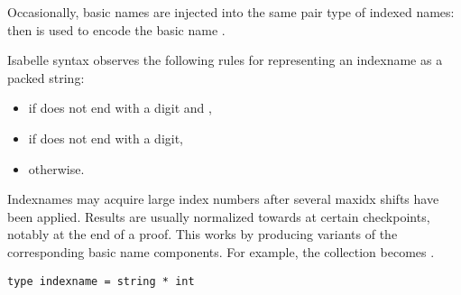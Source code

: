 \begin{isabellebody}
\begin{isamarkuptext}
  Occasionally, basic names are injected into the same pair type of
  indexed names: then  is used to encode the basic
  name .

  \medskip Isabelle syntax observes the following rules for
  representing an indexname  as a packed string:

  \begin{itemize}

  \item {} if  does not end with a digit and ,

  \item {} if  does not end with a digit,

  \item {} otherwise.

  \end{itemize}

  Indexnames may acquire large index numbers after several maxidx
  shifts have been applied.  Results are usually normalized towards
   at certain checkpoints, notably at the end of a proof.
  This works by producing variants of the corresponding basic name
  components.  For example, the collection 
  becomes .%
\end{isamarkuptext}%
\isamarkuptrue%
%
\isadelimmlref
%
\endisadelimmlref
%
\isatagmlref
%
\begin{isamarkuptext}%
\begin{mldecls}
  \verb|type indexname = string * int| \\
  \end{mldecls}

  \begin{description}


\end{description}
\end{isamarkuptext}
\end{isabellebody}
